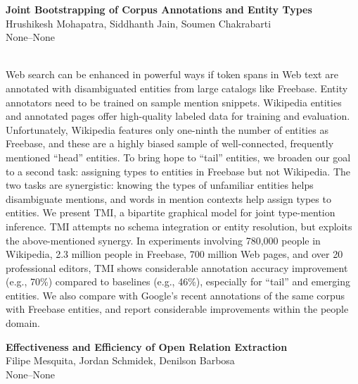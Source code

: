 \documentclass[twoside,makeidx]{book}
\begin{document}
\begin{minipage}{\linewidth}%
\begin{center}
\textbf{\normalsize Joint Bootstrapping of Corpus Annotations and Entity Types}\\
\normalsize  Hrushikesh Mohapatra,  Siddhanth Jain,  Soumen Chakrabarti\\
{\small None--None}\\
\end{center}
\end{minipage}\\[0.5em]
\nopagebreak%
\noindent%
{\small Web search can be enhanced in powerful ways if token spans in Web text are annotated with disambiguated entities from large catalogs like Freebase.  Entity annotators need to be trained on sample mention snippets.  Wikipedia entities and annotated pages offer high-quality labeled data for training and evaluation.  Unfortunately, Wikipedia features only one-ninth the number of entities as Freebase, and these are a highly biased sample of well-connected, frequently mentioned ``head'' entities.  To bring hope to ``tail'' entities, we broaden our goal to a second task: assigning types to entities in Freebase but not Wikipedia. The two tasks are synergistic: knowing the types of unfamiliar entities helps disambiguate mentions, and words in mention contexts help assign types to entities. We present TMI, a bipartite graphical model for joint type-mention inference.  TMI attempts no schema integration or entity resolution, but exploits the above-mentioned synergy.  In experiments involving 780,000 people in Wikipedia, 2.3 million people in Freebase, 700 million Web pages, and over 20 professional editors, TMI shows considerable annotation accuracy improvement (e.g., 70\%) compared to baselines (e.g., 46\%), especially for ``tail'' and emerging entities.  We also compare with Google's recent annotations of the same corpus with Freebase entities, and report considerable improvements within the people domain.}
\par\vspace{2em}\noindent%
\begin{minipage}{\linewidth}%
\begin{center}
\textbf{\normalsize Effectiveness and Efficiency of Open Relation Extraction}\\
\normalsize  Filipe Mesquita,  Jordan Schmidek,  Denilson Barbosa\\
{\small None--None}\\
\end{center}
\end{minipage}\\[0.5em]
\end{document}
